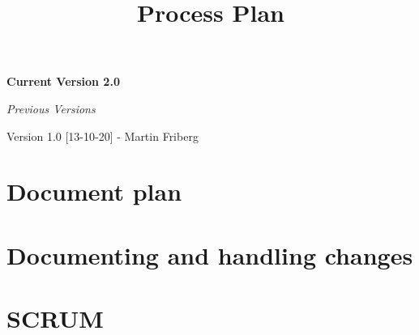 \documentclass[12pt]{article}
\title{\Huge Process Plan}
\author{}
\begin{document}
\maketitle

\begin{center}
    \textbf{\large Current Version 2.0}
    \vspace{10mm}
    
    \emph{\large Previous Versions}
    
    
    Version 1.0 [13-10-20] - Martin Friberg
\end{center}


\clearpage

    \section{Document plan}
    

    \clearpage
    \section{Documenting and handling changes}
        

    \section{SCRUM}
        
    
\end{document}
